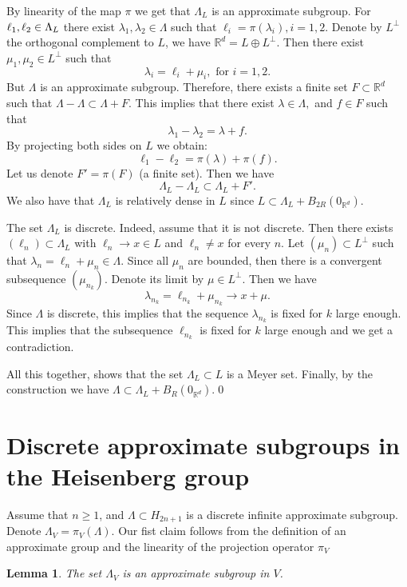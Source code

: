 \documentclass[JEP,XML,SOM,Unicode,NoEqCountersInSection]{cedram}
\newcommand{\bR}{\mathbb{R}}
\newcounter{dummy} \numberwithin{dummy}{section}
\theoremstyle{plain}
\newtheorem{lemma}[dummy]{Lemma}
\theoremstyle{definition}
\begin{document}
By linearity of the map $\pi$ we get that $\Lambda_L$ is an approximate subgroup. For $\ell_1,\ell_2 \in\nobreak \Lambda_L$ there exist $\lambda_1,\lambda_2 \in \Lambda$ such that $\ell_i = \pi(\lambda_i), i = 1,2$. Denote by $L^{\perp}$ the orthogonal complement to $L$, \ie we have $\bR^d = L \oplus L^{\perp}$. Then there exist $\mu_1,\mu_2 \in L^{\perp}$ such that
\[
\lambda_i = \ell_i + \mu_i, \text{ for } i = 1,2.
\]
But $\Lambda$ is an approximate subgroup. Therefore, there exists a finite set $F \subset \bR^d$ such that $\Lambda - \Lambda \subset \Lambda + F$. This implies that there exist $\lambda \in \Lambda,$ and $f \in F$ such that
\[
\lambda_1 - \lambda_2 =\lambda + f.
\]
By projecting both sides on $L$ we obtain:
\[
\ell_1 - \ell_2 = \pi(\lambda) + \pi(f).
\]
Let us denote $F' = \pi(F)$ (a finite set). Then we have
\[
\Lambda_L - \Lambda_L \subset \Lambda_L + F'.
\]
We also have that $\Lambda_L$ is relatively dense in $L$ since $L \subset \Lambda_L + B_{2R}(0_{\bR^d})$.

The set $\Lambda_L$ is discrete. Indeed, assume that it is not discrete. Then there exists $(\ell_n) \subset \Lambda_L$ with $\ell_n \to x \in L$ and $\ell_n \neq x$ for every $n$. Let $(\mu_n) \subset L^{\perp}$ such that $\lambda_n = \ell_n + \mu_n \in \Lambda$. Since all $\mu_n$ are bounded, then there is a convergent subsequence $(\mu_{n_k})$. Denote its limit by $\mu \in L^{\perp}$. Then we have
\[
\lambda_{n_k} = \ell_{n_k} + \mu_{n_k} \to x + \mu.
\]
Since $\Lambda$ is discrete, this implies that the sequence $\lambda_{n_k}$ is fixed for $k$ large enough. This implies that the subsequence $\ell_{n_k}$ is fixed for $k$ large enough and we get a contradiction.

All this together, shows that the set $\Lambda_L \subset L$ is a Meyer set. Finally, by the construction we have $\Lambda \subset \Lambda_L + B_R(0_{\bR^d})$.\qed

\section{Discrete approximate subgroups in the Heisenberg group}

Assume that $n \ge 1$, and $\Lambda \subset H_{2n+1}$ is a discrete infinite approximate subgroup. Denote $\Lambda_V = \pi_V(\Lambda)$. Our fist claim follows from the definition of an approximate group and the linearity of the projection operator $\pi_V$

\begin{lemma}
\label{heis-lem-1}
The set $\Lambda_V$ is an approximate subgroup in $V$.
\end{lemma}
\end{document}
